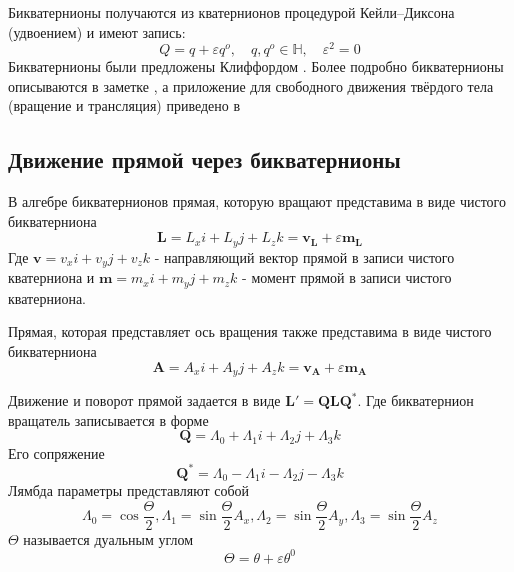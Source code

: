   Бикватернионы получаются из кватернионов процедурой Кейли--Диксона (удвоением) и имеют запись:
  \begin{equation*}
    Q = q + \varepsilon q^o, \quad q,q^o \in \mathbb{H}, \quad \varepsilon^2=0
  \end{equation*}
  Бикватернионы были предложены Клиффордом \autocite{cliffordPreliminarySketchBiquaternions1871}. Более подробно бикватернионы описываются в заметке \autocite{jiaDualQuaternions2018},
  а приложение для свободного движения твёрдого тела (вращение и трансляция) приведено в \autocite[Гл. N]{chelnokov2006кватернионные}

  \subsection{Движение прямой через бикватернионы}

  В алгебре бикватернионов прямая, которую вращают представима в виде чистого бикватерниона
  \begin{equation*}
    \mathbf{L} = L_x i + L_y j + L_z k = \mathbf{v}_\mathbf{L} + \varepsilon \mathbf{m}_\mathbf{L}
  \end{equation*}
  Где $\mathbf{v} = v_x i + v_y j + v_z k$ - направляющий вектор прямой в записи чистого кватерниона и $\mathbf{m} = m_x i + m_y j + m_z k$ - момент прямой в записи чистого кватерниона.
  
  Прямая, которая представляет ось вращения также представима в виде чистого бикватерниона
  \begin{equation*}
    \mathbf{A} = A_x i + A_y j + A_z k = \mathbf{v}_\mathbf{A} + \varepsilon \mathbf{m}_\mathbf{A}
  \end{equation*}

  Движение и поворот прямой задается в виде $\mathbf{L}' = \mathbf{QLQ^*}$. Где бикватернион вращатель записывается в форме
  \begin{equation*}
    \mathbf{Q} = \Lambda_0 + \Lambda_1 i + \Lambda_2 j + \Lambda_3 k
  \end{equation*}
  Его сопряжение 
  \begin{equation*}
    \mathbf{Q}^* = \Lambda_0 - \Lambda_1 i - \Lambda_2 j - \Lambda_3 k
  \end{equation*}
  Лямбда параметры представляют собой
  \begin{equation*}
    \Lambda_0 = \cos{\frac{\Theta}{2}}, \Lambda_1 = \sin{\frac{\Theta}{2}}A_x, \Lambda_2 = \sin{\frac{\Theta}{2}}A_y, \Lambda_3 = \sin{\frac{\Theta}{2}}A_z
  \end{equation*}
  $\Theta$ называется дуальным углом  
  \begin{equation*}
    \Theta  = \theta + \varepsilon \theta^0
  \end{equation*}


